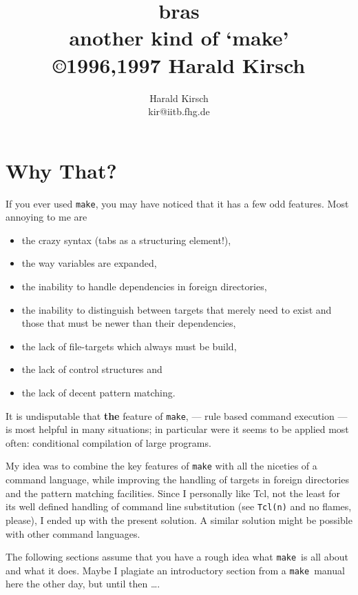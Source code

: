 \documentclass[12pt]{article}
\title{\textsf{bras}\\
another kind of `make'\\
\small \copyright 1996,1997 Harald Kirsch}
\author{\relax
Harald Kirsch\\
kir@iitb.fhg.de}
\newcommand{\make}{\texttt{make}}
\begin{document}
\maketitle
\tableofcontents

\section{Why That?}
If you ever used \texttt{make}, you may have noticed that it has a few
odd features. Most annoying to me are
\begin{itemize}
\item the crazy syntax (tabs as a structuring element!),
\item the way variables are expanded,
\item the inability to handle dependencies in foreign directories,
\item the inability to distinguish between targets that merely need to
  exist and those that must be newer than their dependencies,
\item the lack of file-targets which always must be build,
\item the lack of control structures and 
\item the lack of decent pattern matching.
\end{itemize}

It is undisputable that \textbf{the} feature of \texttt{make}, ---
rule based command execution --- is most helpful in many situations;
in particular were it seems to be applied most often:
conditional compilation of large programs.

My idea was to combine the key features of \texttt{make} with all the
niceties of a command language, while improving the handling of
targets in foreign directories and the pattern matching
facilities. Since I personally like Tcl, not the least for its well
defined handling of command line substitution (see \texttt{Tcl(n)} and
no flames, please), I ended up with the present solution. A similar
solution might be possible with other command languages.

The following sections assume that you have a rough idea what \make\
is all about and what it does. Maybe I plagiate an introductory
section from a \make\ manual here the other day, but until then
\ldots.

\end{document}
